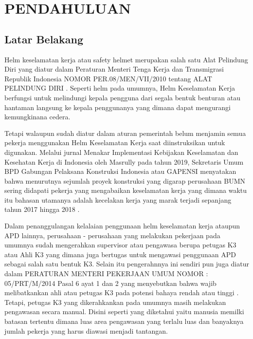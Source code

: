 \chapter{PENDAHULUAN}
\label{chap:pendahuluan}


\section{Latar Belakang}
\label{sec:latarbelakang}

Helm keselamatan kerja atau safety helmet merupakan salah satu Alat Pelindung Diri yang diatur dalam 
Peraturan Menteri Tenga Kerja dan Transmigrasi Republik Indonesia NOMOR PER.08/MEN/VII/2010 tentang ALAT PELINDUNG DIRI \cite{suratkementriantenagakerja}. Seperti helm pada umumnya, Helm Keselamatan Kerja berfungsi untuk melindungi kepala pengguna dari segala bentuk benturan atau hantaman langsung ke kepala penggunanya yang dimana dapat mengurangi kemungkinana cedera.

Tetapi walaupun sudah diatur dalam aturan pemerintah belum menjamin semua pekerja menggunakan Helm Keselamatan Kerja saat diinstruksikan untuk digunakan. Melalui jurnal Menakar Implementasi Kebijakan Keselamatan dan Kesehatan Kerja di Indonesia oleh Masrully pada tahun 2019, Sekretaris Umum BPD Gabungan Pelaksana Konstruksi Indonesia atau GAPENSI menyatakan bahwa menurutnya sejumlah proyek konstruksi yang digarap perusahaan BUMN sering didapati pekerja yang mengabaikan keselamatan kerja yang dimana waktu itu bahasan utamanya adalah kecelakan kerja yang marak terjadi sepanjang tahun 2017 hingga 2018 \cite{masrully2019menakar}.

Dalam penanggulangan kelalaian penggunaan helm keselamatan kerja ataupun APD lainnya, perusahaan - perusahaan yang melakukan pekerjaan pada umumnya sudah mengerahkan supervisor atau pengawasa berupa petugas K3 atau Ahli K3 yang dimana juga bertugas untuk mengawasi penggunaan APD sebagai salah satu bentuk K3. Selain itu pengerahnnya  ini sendiri pun juga diatur dalam PERATURAN MENTERI PEKERJAAN UMUM NOMOR : 05/PRT/M/2014 Pasal 6 ayat 1 dan 2  yang menyebutkan bahwa wajib melibatkankan ahli atau petugas K3 pada potensi bahaya rendah atau tinggi \cite{kementrianpekerjaanumum}. Tetapi, petugas K3 yang dikerahkankan pada umumnya masih melakukan pengawasan secara manual. Disini seperti yang diketahui yaitu manusia memilki batasan tertentu dimana luas area pengawasan yang terlalu luas dan banyaknya jumlah pekerja yang harus diawasi menjadi tantangan.

